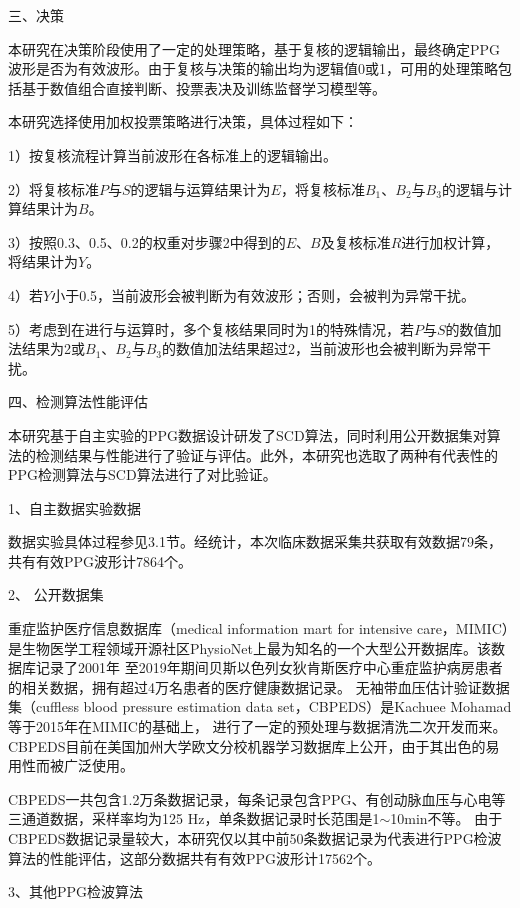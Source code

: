 三、决策

本研究在决策阶段使用了一定的处理策略，基于复核的逻辑输出，最终确定PPG波形是否为有效波形。由于复核与决策的输出均为逻辑值0或1，可用的处理策略包括基于数值组合直接判断、投票表决及训练监督学习模型等\cite{Zhou2016}。

本研究选择使用加权投票策略进行决策，具体过程如下：

1）按复核流程计算当前波形在各标准上的逻辑输出。

2）将复核标准$P$与$S$的逻辑与运算结果计为$E$，将复核标准$B_1$、$B_2$与$B_3$的逻辑与计算结果计为$B$。

3）按照0.3、0.5、0.2的权重对步骤2中得到的$E$、$B$及复核标准$R$进行加权计算，将结果计为$Y$。

4）若$Y$小于0.5，当前波形会被判断为有效波形；否则，会被判为异常干扰。

5）考虑到在进行与运算时，多个复核结果同时为1的特殊情况，若$P$与$S$的数值加法结果为2或$B_1$、$B_2$与$B_3$的数值加法结果超过2，当前波形也会被判断为异常干扰。

四、检测算法性能评估

本研究基于自主实验的PPG数据设计研发了SCD算法，同时利用公开数据集对算法的检测结果与性能进行了验证与评估。此外，本研究也选取了两种有代表性的PPG检测算法与SCD算法进行了对比验证。

1、自主数据实验数据

数据实验具体过程参见3.1节。经统计，本次临床数据采集共获取有效数据79条，共有有效PPG波形计7864个。

2、 公开数据集

重症监护医疗信息数据库（medical information mart for intensive care，MIMIC）是生物医学工程领域开源社区PhysioNet上最为知名的一个大型公开数据库\cite{mit2022,Goldberger2000,johnson2018mimic,mimic4}。该数据库记录了2001年
至2019年期间贝斯以色列女狄肯斯医疗中心重症监护病房患者的相关数据，拥有超过4万名患者的医疗健康数据记录\cite{johnson2018mimic}。
无袖带血压估计验证数据集（cuffless blood pressure estimation data set，CBPEDS）是Kachuee Mohamad等\cite{Kachuee2015,ucibp2022}于2015年在MIMIC的基础上，
进行了一定的预处理与数据清洗二次开发而来。CBPEDS目前在美国加州大学欧文分校机器学习数据库上公开，由于其出色的易用性而被广泛使用。

CBPEDS一共包含1.2万条数据记录，每条记录包含PPG、有创动脉血压与心电等三通道数据，采样率均为125 Hz，单条数据记录时长范围是1$\sim$10min不等。
由于CBPEDS数据记录量较大，本研究仅以其中前50条数据记录为代表进行PPG检波算法的性能评估，这部分数据共有有效PPG波形计17562个。

3、其他PPG检波算法


